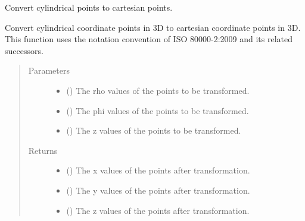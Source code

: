 \documentclass[letterpaper,10pt,english]{sphinxmanual}
\begin{document}

\begin{fulllineitems}
\label{\detokenize{Backend.coordinate_system_transformation:Backend.coordinate_system_transformation.cylindrical_to_cartesian_3d}}
Convert cylindrical points to cartesian points.

Convert cylindrical coordinate points in 3D to cartesian coordinate points
in 3D. This function uses the notation convention of ISO 80000-2:2009 and
its related successors.
\begin{quote}\begin{description}
\item[{Parameters}] \leavevmode\begin{itemize}
\item {} 
 () \textendash{} The rho values of the points to be transformed.

\item {} 
 () \textendash{} The phi values of the points to be transformed.

\item {} 
 () \textendash{} The z values of the points to be transformed.

\end{itemize}

\item[{Returns}] \leavevmode
\begin{itemize}
\item {} 
 () \textendash{} The x values of the points after transformation.

\item {} 
 () \textendash{} The y values of the points after transformation.

\item {} 
 () \textendash{} The z values of the points after transformation.

\end{itemize}


\end{description}\end{quote}

\end{fulllineitems}
\end{document}
